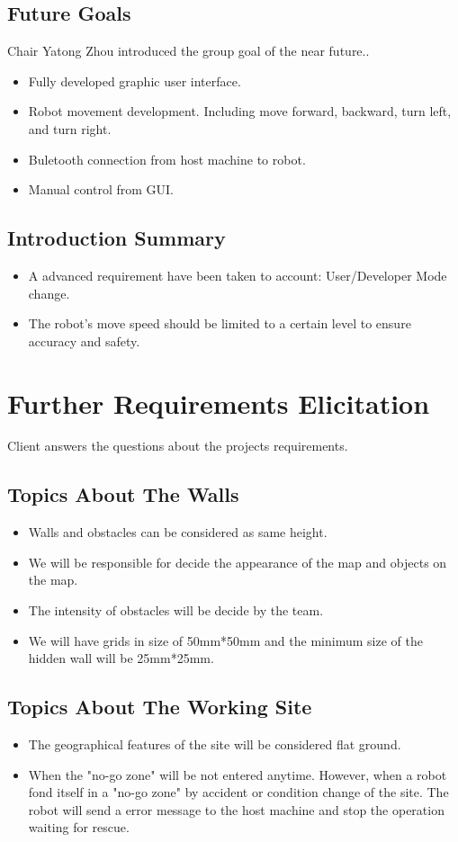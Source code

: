\documentclass[11pt, a4paper]{article}
\begin{document}
\subsection{Future Goals}
Chair Yatong Zhou introduced the group goal of the near future..
\begin{itemize}
\item Fully developed graphic user interface. 
\item Robot movement development. Including move forward, backward, turn left, and turn right. 
\item Buletooth connection from host machine to robot. 
\item Manual control from GUI.
\end{itemize}

\subsection{Introduction Summary}
\begin{itemize}
\item A advanced requirement have been taken to account: User/Developer Mode change. 
\item The robot's move speed should be limited to a certain level to ensure accuracy and safety. 
\end{itemize}


\section{Further Requirements Elicitation}
Client answers the questions about the projects requirements. 

\subsection{Topics About The Walls}
\begin{itemize}
\item Walls and obstacles can be considered as same height.
\item We will be responsible for decide the appearance of the map and objects on the map.
\item The intensity of obstacles will be decide by the team. 
\item We will have grids in size of 50mm*50mm and the minimum size of the hidden wall will be 25mm*25mm.
\end{itemize}

\subsection{Topics About The Working Site}
\begin{itemize}
\item The geographical features of the site will be considered flat ground. 
\item When the "no-go zone" will be not entered anytime. However, when a robot fond itself in a "no-go zone" by accident or condition change of the site. The robot will send a error message to the host machine and stop the operation waiting for rescue.
\end{itemize}
\end{document}
